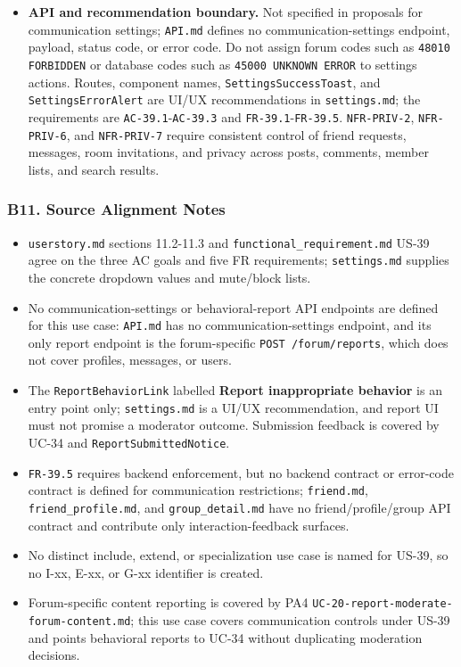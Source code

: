 \documentclass[12pt]{article}
\begin{document}
\begin{itemize}
\item \textbf{API and recommendation boundary.} Not specified in proposals for communication settings; \texttt{API.md} defines no communication-settings endpoint, payload, status code, or error code. Do not assign forum codes such as \texttt{48010 FORBIDDEN} or database codes such as \texttt{45000 UNKNOWN ERROR} to settings actions. Routes, component names, \texttt{SettingsSuccessToast}, and \texttt{SettingsErrorAlert} are UI/UX recommendations in \texttt{settings.md}; the requirements are \texttt{AC-39.1}-\texttt{AC-39.3} and \texttt{FR-39.1}-\texttt{FR-39.5}. \texttt{NFR-PRIV-2}, \texttt{NFR-PRIV-6}, and \texttt{NFR-PRIV-7} require consistent control of friend requests, messages, room invitations, and privacy across posts, comments, member lists, and search results.
\end{itemize}
\par\medskip

\hypertarget{sec:b11-source-alignment-notes}{}
\subsubsection*{B11. Source Alignment Notes}
\par\medskip

\begin{itemize}
\item \texttt{userstory.md} sections 11.2-11.3 and \texttt{functional\_requirement.md} US-39 agree on the three AC goals and five FR requirements; \texttt{settings.md} supplies the concrete dropdown values and mute/block lists.
\item No communication-settings or behavioral-report API endpoints are defined for this use case: \texttt{API.md} has no communication-settings endpoint, and its only report endpoint is the forum-specific \texttt{POST /forum/reports}, which does not cover profiles, messages, or users.
\item The \texttt{ReportBehaviorLink} labelled \textbf{Report inappropriate behavior} is an entry point only; \texttt{settings.md} is a UI/UX recommendation, and report UI must not promise a moderator outcome. Submission feedback is covered by UC-34 and \texttt{ReportSubmittedNotice}.
\item \texttt{FR-39.5} requires backend enforcement, but no backend contract or error-code contract is defined for communication restrictions; \texttt{friend.md}, \texttt{friend\_profile.md}, and \texttt{group\_detail.md} have no friend/profile/group API contract and contribute only interaction-feedback surfaces.
\item No distinct include, extend, or specialization use case is named for US-39, so no I-xx, E-xx, or G-xx identifier is created.
\item Forum-specific content reporting is covered by PA4 \texttt{UC-20-report-moderate-forum-content.md}; this use case covers communication controls under US-39 and points behavioral reports to UC-34 without duplicating moderation decisions.
\end{itemize}
\par\medskip
\end{document}
